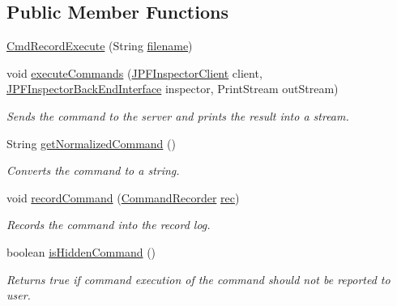 \subsection*{Public Member Functions}
\begin{DoxyCompactItemize}
\item 
\hyperlink{classgov_1_1nasa_1_1jpf_1_1inspector_1_1client_1_1commands_1_1_cmd_record_execute_ad33111d54e14488696f322fbad478538}{Cmd\+Record\+Execute} (String \hyperlink{classgov_1_1nasa_1_1jpf_1_1inspector_1_1client_1_1commands_1_1_cmd_record_execute_afb4cff074ad1e98dae860a1f74b83731}{filename})
\item 
void \hyperlink{classgov_1_1nasa_1_1jpf_1_1inspector_1_1client_1_1commands_1_1_cmd_record_execute_a1a6ebb9cb4168b18a8b767bee92aecdf}{execute\+Commands} (\hyperlink{classgov_1_1nasa_1_1jpf_1_1inspector_1_1client_1_1_j_p_f_inspector_client}{J\+P\+F\+Inspector\+Client} client, \hyperlink{interfacegov_1_1nasa_1_1jpf_1_1inspector_1_1interfaces_1_1_j_p_f_inspector_back_end_interface}{J\+P\+F\+Inspector\+Back\+End\+Interface} inspector, Print\+Stream out\+Stream)
\begin{DoxyCompactList}\small\item\em Sends the command to the server and prints the result into a stream. \end{DoxyCompactList}\item 
String \hyperlink{classgov_1_1nasa_1_1jpf_1_1inspector_1_1client_1_1commands_1_1_cmd_record_execute_ac18e7da35b73f01ae0b017ced58e264e}{get\+Normalized\+Command} ()
\begin{DoxyCompactList}\small\item\em Converts the command to a string. \end{DoxyCompactList}\item 
void \hyperlink{classgov_1_1nasa_1_1jpf_1_1inspector_1_1client_1_1commands_1_1_cmd_record_execute_a087ea4a48760edf902244ad220c3e410}{record\+Command} (\hyperlink{classgov_1_1nasa_1_1jpf_1_1inspector_1_1client_1_1_command_recorder}{Command\+Recorder} \hyperlink{classgov_1_1nasa_1_1jpf_1_1inspector_1_1client_1_1_client_command_af4246f2427035c72a6af45a2c61361f7}{rec})
\begin{DoxyCompactList}\small\item\em Records the command into the record log. \end{DoxyCompactList}\item 
boolean \hyperlink{classgov_1_1nasa_1_1jpf_1_1inspector_1_1client_1_1_client_command_afb09c400c64e2d8e01059b91ff847761}{is\+Hidden\+Command} ()
\begin{DoxyCompactList}\small\item\em Returns true if command execution of the command should not be reported to user. \end{DoxyCompactList}\end{DoxyCompactItemize}
